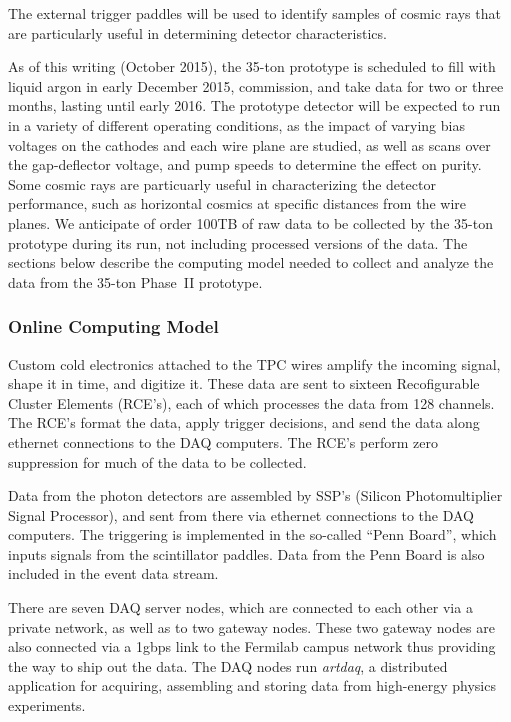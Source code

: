 The external trigger paddles will be used to identify samples of cosmic rays that are particularly useful in determining
detector characteristics.

As of this writing (October 2015), the 35-ton prototype is scheduled to fill with liquid argon
in early December 2015, commission, and take data for two or three months, lasting until early 2016.
The prototype detector will be expected to run in a variety of different operating conditions, as
the impact of varying bias voltages on the cathodes and each wire plane are studied, as well as
scans over the gap-deflector voltage, and pump speeds to determine the effect on purity.  Some cosmic
rays are particuarly useful in characterizing the detector performance, such as horizontal cosmics
at specific distances from the wire planes.  We anticipate of order 100TB of raw data to be collected
by the 35-ton prototype during its run, not including processed versions of the data.
The sections below describe the computing model needed
to collect and analyze the data from the 35-ton Phase~II prototype.

\subsubsection{Online Computing Model}

Custom cold electronics attached to the TPC wires amplify the incoming signal, shape it in time,
and digitize it.  These data are sent to sixteen Recofigurable Cluster Elements (RCE's), each of which
processes the data from 128 channels.  The RCE's format the data, apply trigger decisions, and send the
data along ethernet connections to the DAQ computers.  The RCE's perform zero suppression for
much of the data to be collected.


Data from the photon detectors are assembled
by SSP's (Silicon Photomultiplier Signal Processor), and sent from there via ethernet connections to the DAQ computers.  The
triggering is implemented in the so-called ``Penn Board'', which inputs signals from the scintillator paddles.  Data
from the Penn Board is also included in the event data stream.

There are seven DAQ server nodes, which are connected to each other via a private network, as well as to two gateway nodes. 
These two gateway nodes are also connected via a 1gbps link to the Fermilab campus network thus providing the way
to ship out the data. The DAQ nodes run {\it artdaq}, a distributed application for acquiring, assembling and storing data from high-energy
physics experiments. 

